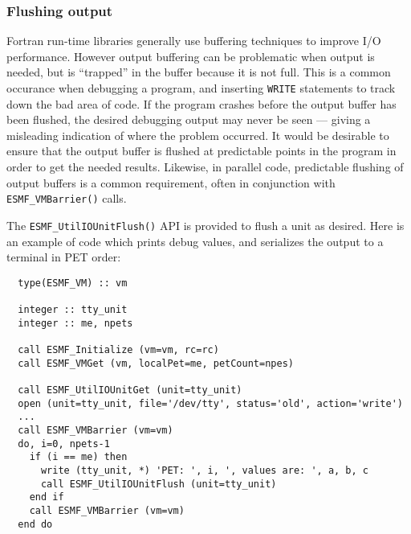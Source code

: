 \subsubsection{Flushing output}

Fortran run-time libraries generally use buffering techniques to improve I/O
performance.  However output buffering can be problematic when output is needed,
but is ``trapped'' in the buffer because it is not full.
This is a common occurance when debugging a program, and inserting {\tt WRITE} statements
to track down the bad area of code.  If the program crashes before the output
buffer has been flushed, the desired debugging output may never be seen --- giving
a misleading indication of where the problem occurred.  It would be desirable
to ensure that the output buffer is flushed at predictable
points in the program in order to get the needed results.
Likewise, in parallel code, predictable flushing of output buffers is a common
requirement, often in conjunction with {\tt ESMF\_VMBarrier()} calls.  

The {\tt ESMF\_UtilIOUnitFlush()} API is provided to flush a unit as desired.  Here is
an example of code which prints debug values, and serializes the output to a
terminal in PET order:

\begin{verbatim}
  type(ESMF_VM) :: vm

  integer :: tty_unit
  integer :: me, npets

  call ESMF_Initialize (vm=vm, rc=rc)
  call ESMF_VMGet (vm, localPet=me, petCount=npes)

  call ESMF_UtilIOUnitGet (unit=tty_unit)
  open (unit=tty_unit, file='/dev/tty', status='old', action='write')
  ...
  call ESMF_VMBarrier (vm=vm)
  do, i=0, npets-1
    if (i == me) then
      write (tty_unit, *) 'PET: ', i, ', values are: ', a, b, c
      call ESMF_UtilIOUnitFlush (unit=tty_unit)
    end if
    call ESMF_VMBarrier (vm=vm)
  end do
\end{verbatim}
